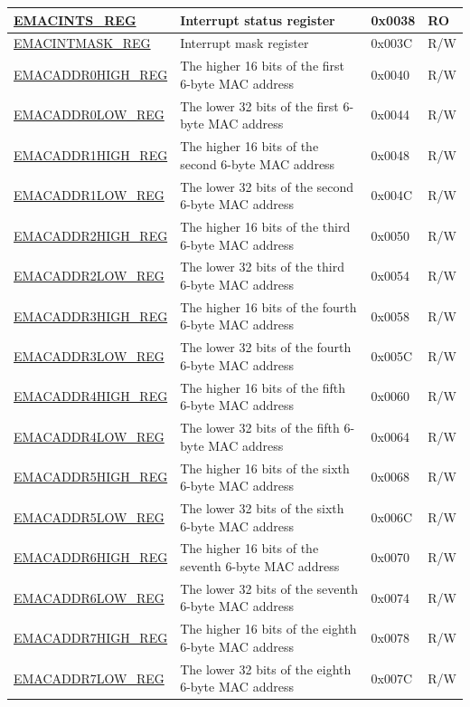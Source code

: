\begin{longtable}{ |m{6cm} |m{5.3cm} | m{2cm} | m{2.2cm} | }
\hyperref[regdesc:EMACINTSREG]{EMACINTS\_REG} & Interrupt status register & 0x0038 & RO \\ \hline
\hyperref[regdesc:EMACINTMASKREG]{EMACINTMASK\_REG} & Interrupt mask register & 0x003C & R/W \\ \hline
\hyperref[regdesc:EMACADDR0HIGHREG]{EMACADDR0HIGH\_REG} & The higher 16 bits of the first 6-byte MAC address & 0x0040 & R/W \\ \hline
\hyperref[regdesc:EMACADDR0LOWREG]{EMACADDR0LOW\_REG} & The lower 32 bits of the first 6-byte MAC address & 0x0044 & R/W \\ \hline
\hyperref[regdesc:EMACADDR1HIGHREG]{EMACADDR1HIGH\_REG} & The higher 16 bits of the second 6-byte MAC address& 0x0048 & R/W \\ \hline
\hyperref[regdesc:EMACADDR1LOWREG]{EMACADDR1LOW\_REG} & The lower 32 bits of the second 6-byte MAC address& 0x004C & R/W \\ \hline
\hyperref[regdesc:EMACADDR2HIGHREG]{EMACADDR2HIGH\_REG} & The higher 16 bits of the third 6-byte MAC address& 0x0050 & R/W \\ \hline
\hyperref[regdesc:EMACADDR2LOWREG]{EMACADDR2LOW\_REG} & The lower 32 bits of the third 6-byte MAC address& 0x0054 & R/W \\ \hline
\hyperref[regdesc:EMACADDR3HIGHREG]{EMACADDR3HIGH\_REG} &  The higher 16 bits of the fourth 6-byte MAC address & 0x0058 & R/W \\ \hline
\hyperref[regdesc:EMACADDR3LOWREG]{EMACADDR3LOW\_REG} & The lower 32 bits of the fourth 6-byte MAC address & 0x005C & R/W \\ \hline
\hyperref[regdesc:EMACADDR4HIGHREG]{EMACADDR4HIGH\_REG} &  The higher 16 bits of the fifth 6-byte MAC address & 0x0060 & R/W \\ \hline
\hyperref[regdesc:EMACADDR4LOWREG]{EMACADDR4LOW\_REG} & The lower 32 bits of the fifth 6-byte MAC address & 0x0064 & R/W \\ \hline
\hyperref[regdesc:EMACADDR5HIGHREG]{EMACADDR5HIGH\_REG} &  The higher 16 bits of the sixth 6-byte MAC address & 0x0068 & R/W \\ \hline
\hyperref[regdesc:EMACADDR5LOWREG]{EMACADDR5LOW\_REG} & The lower 32 bits of the sixth 6-byte MAC address & 0x006C & R/W \\ \hline
\hyperref[regdesc:EMACADDR6HIGHREG]{EMACADDR6HIGH\_REG} &  The higher 16 bits of the seventh 6-byte MAC address & 0x0070 & R/W \\ \hline
\hyperref[regdesc:EMACADDR6LOWREG]{EMACADDR6LOW\_REG} & The lower 32 bits of the seventh 6-byte MAC address & 0x0074 & R/W \\ \hline
\hyperref[regdesc:EMACADDR7HIGHREG]{EMACADDR7HIGH\_REG} &  The higher 16 bits of the eighth 6-byte MAC address & 0x0078 & R/W \\ \hline
\hyperref[regdesc:EMACADDR7LOWREG]{EMACADDR7LOW\_REG} & The lower 32 bits of the eighth 6-byte MAC address & 0x007C & R/W \\ \hline


\end{longtable}
